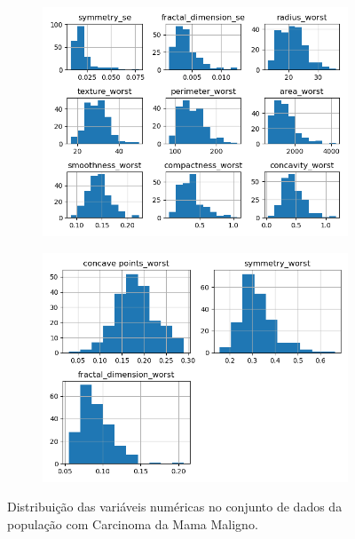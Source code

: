 \begin{figure}[H]
\begin{subfigure}[b]{0.3\textwidth}
\includegraphics[scale=0.3]{images/hist_cancer_yes_3.png}
     \end{subfigure}
          \hfill
     \begin{subfigure}[b]{0.3\textwidth}
 \centering
\includegraphics[scale=0.3]{images/hist_cancer_yes_4.png}
     \end{subfigure}
        \caption{Distribuição das variáveis numéricas no conjunto de dados da população com Carcinoma da Mama Maligno.}
         \label{fig:var:cancer:m}
\end{figure}

